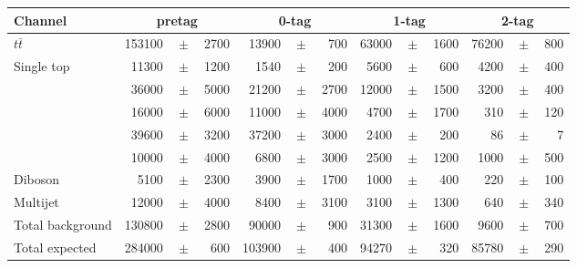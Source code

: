 \begin{table}
  \begin{tabular}{ l  rrr  rrr  rrr  rrr }
    \toprule
    Channel & \multicolumn{3}{c}{\ejets{} pretag} & \multicolumn{3}{c}{\ejets{} 0-tag} & \multicolumn{3}{c}{\ejets{} 1-tag} & \multicolumn{3}{c}{\ejets{} 2-tag} \\
    \midrule
    $t\bar{t}$            & 153100 &$\!\!\!\pm\!\!\!$& 2700   & 13900 &$\!\!\!\pm\!\!\!$& 700   & 63000 &$\!\!\!\pm\!\!\!$& 1600   & 76200 &$\!\!\!\pm\!\!\!$& 800  \\ 
    Single top            & 11300  &$\!\!\!\pm\!\!\!$& 1200   & 1540 &$\!\!\!\pm\!\!\!$& 200    & 5600 &$\!\!\!\pm\!\!\!$& 600     & 4200 &$\!\!\!\pm\!\!\!$& 400  \\
    \wbb{}                & 36000  &$\!\!\!\pm\!\!\!$& 5000   & 21200 &$\!\!\!\pm\!\!\!$& 2700  & 12000 &$\!\!\!\pm\!\!\!$& 1500   & 3200 &$\!\!\!\pm\!\!\!$& 400  \\
    \wc{}                 & 16000  &$\!\!\!\pm\!\!\!$& 6000   & 11000 &$\!\!\!\pm\!\!\!$& 4000  & 4700 &$\!\!\!\pm\!\!\!$& 1700    & 310 &$\!\!\!\pm\!\!\!$& 120\\
    \wlight{}             & 39600  &$\!\!\!\pm\!\!\!$& 3200   & 37200 &$\!\!\!\pm\!\!\!$& 3000  & 2400 &$\!\!\!\pm\!\!\!$& 200     & 86 &$\!\!\!\pm\!\!\!$& 7     \\ 
    \zjets{}              & 10000  &$\!\!\!\pm\!\!\!$& 4000   & 6800 &$\!\!\!\pm\!\!\!$& 3000   & 2500 &$\!\!\!\pm\!\!\!$& 1200    & 1000 &$\!\!\!\pm\!\!\!$& 500\\
    Diboson               & 5100   &$\!\!\!\pm\!\!\!$& 2300   & 3900 &$\!\!\!\pm\!\!\!$& 1700   & 1000 &$\!\!\!\pm\!\!\!$& 400     & 220 &$\!\!\!\pm\!\!\!$& 100   \\ 
    Multijet              & 12000  &$\!\!\!\pm\!\!\!$& 4000   & 8400 &$\!\!\!\pm\!\!\!$& 3100   & 3100 &$\!\!\!\pm\!\!\!$& 1300    & 640 &$\!\!\!\pm\!\!\!$& 340 \\
    \midrule                                                                                                                                            
    Total background      & 130800 &$\!\!\!\pm\!\!\!$& 2800   & 90000 &$\!\!\!\pm\!\!\!$& 900   & 31300 &$\!\!\!\pm\!\!\!$& 1600   & 9600 &$\!\!\!\pm\!\!\!$& 700  \\
    \midrule                                                                                                                                                
    Total expected        & 284000 &$\!\!\!\pm\!\!\!$& 600    & 103900 &$\!\!\!\pm\!\!\!$& 400  & 94270 &$\!\!\!\pm\!\!\!$& 320    & 85780 &$\!\!\!\pm\!\!\!$& 290 \\

\end{tabular}
\end{table}
